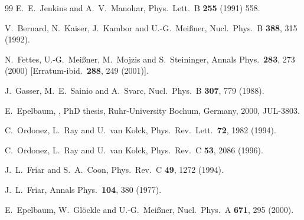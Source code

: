 \documentclass[aps,rmp,nofootinbib,twocolumn,floatfix]{revtex4}
\begin{document}
\begin{thebibliography}{99}
  E.~E.~Jenkins and A.~V.~Manohar,
  Phys.\ Lett.\  B {\bf 255} (1991) 558.

  V.~Bernard, N.~Kaiser, J.~Kambor and U.-G.~Mei\ss ner,
  Nucl.\ Phys.\  B {\bf 388}, 315 (1992).

  N.~Fettes, U.-G.~Mei\ss ner, M.~Mojzis and S.~Steininger,
  Annals Phys.\  {\bf 283}, 273 (2000)
  [Erratum-ibid.\  {\bf 288}, 249 (2001)].

  J.~Gasser, M.~E.~Sainio and A.~Svarc,
  Nucl.\ Phys.\  B {\bf 307}, 779 (1988).

E.~Epelbaum,
,
\newblock PhD thesis, Ruhr-University Bochum, Germany, 2000,
\newblock JUL-3803.

  C.~Ordonez, L.~Ray and U.~van Kolck,
  Phys.\ Rev.\ Lett.\  {\bf 72}, 1982 (1994).

  C.~Ordonez, L.~Ray and U.~van Kolck,
  Phys.\ Rev.\  C {\bf 53}, 2086 (1996).

  J.~L.~Friar and S.~A.~Coon,
  Phys.\ Rev.\  C {\bf 49}, 1272 (1994).

  J.~L.~Friar,
  Annals Phys.\  {\bf 104}, 380 (1977).


  E.~Epelbaum, W.~Gl\"ockle and U.-G.~Mei\ss ner,
  Nucl.\ Phys.\  A {\bf 671}, 295 (2000).


\end{thebibliography}
\end{document}
